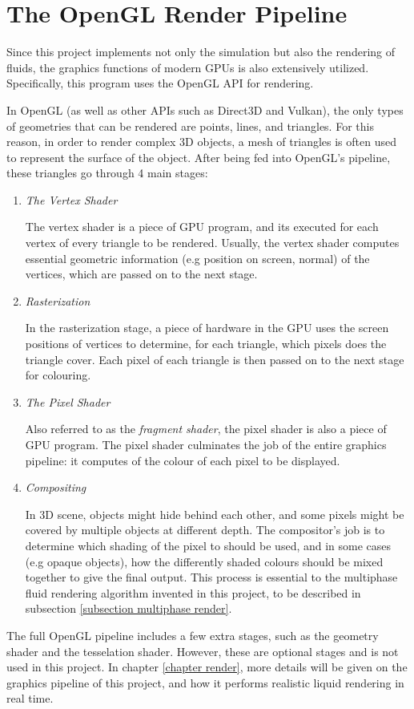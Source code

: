 \section{The OpenGL Render Pipeline}
\label{section opengl}

Since this project implements not only the simulation but also the rendering of fluids, the graphics functions of modern GPUs is also extensively utilized. Specifically, this program uses the OpenGL API for rendering.

In OpenGL (as well as other APIs such as Direct3D and Vulkan), the only types of geometries that can be rendered are points, lines, and triangles. For this reason, in order to render complex 3D objects, a mesh of triangles is often used to represent the surface of the object. After being fed into OpenGL's pipeline, these triangles go through 4 main stages:
\begin{enumerate}
    \item 
    \textit{The Vertex Shader}

    The vertex shader is a piece of GPU program, and its executed for each vertex of every triangle to be rendered. Usually, the vertex shader computes essential geometric information (e.g position on screen, normal) of the vertices, which are passed on to the next stage.
    
    \item 
    \textit{Rasterization}

    In the rasterization stage, a piece of hardware in the GPU uses the screen positions of vertices to determine, for each triangle, which pixels does the triangle cover. Each pixel of each triangle is then passed on to the next stage for colouring.
    
    \item
    \textit{The Pixel Shader}

    Also referred to as the \textit{fragment shader}, the pixel shader is also a piece of GPU program. The pixel shader culminates the job of the entire graphics pipeline: it computes of the colour of each pixel to be displayed.

    \item 
    \textit{Compositing}

    In 3D scene, objects might hide behind each other, and some pixels might be covered by multiple objects at different depth. The compositor's job is to determine which shading of the pixel to should be used, and in some cases (e.g opaque objects), how the differently shaded colours should be mixed together to give the final output. This process is essential to the multiphase fluid rendering algorithm invented in this project, to be described in subsection \ref{subsection multiphase render}.
    
\end{enumerate}

The full OpenGL pipeline includes a few extra stages, such as the geometry shader and the tesselation shader. However, these are optional stages and is not used in this project. In chapter \ref{chapter render}, more details will be given on the graphics pipeline of this project, and how it performs realistic liquid rendering in real time.